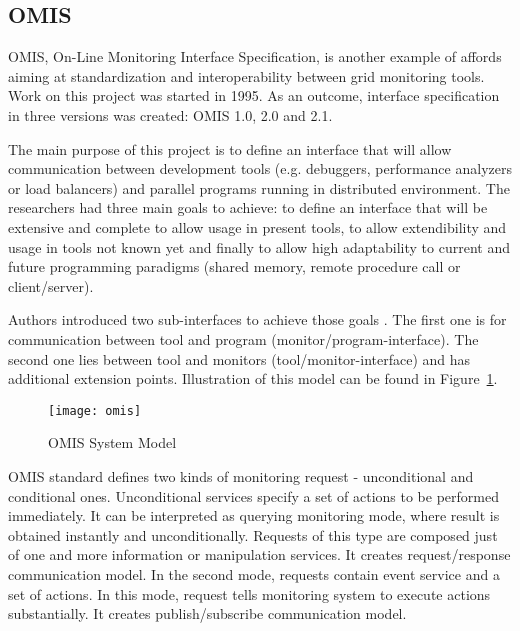 
\subsection{OMIS}

\label{ssec:omis}

OMIS, On-Line Monitoring Interface Specification, is another example of affords aiming at standardization and interoperability between grid monitoring tools. Work on this project was started in 1995. As an outcome, interface specification in three versions was created: OMIS 1.0\cite{OMIS1}, 2.0\cite{OMIS2} and 2.1.

The main purpose of this project is to define an interface that will allow communication between development tools (e.g. debuggers, performance analyzers or load balancers) and parallel programs running in distributed environment. The researchers had three main goals to achieve: to define an interface that will be extensive and complete to allow usage in present tools, to allow extendibility and usage in tools not known yet and finally to allow high adaptability to current and future programming paradigms (shared memory, remote procedure call or client/server).

Authors introduced two sub-interfaces to achieve those goals . The first one is for communication between tool and program (monitor/program-interface). The second one lies between tool and monitors (tool/monitor-interface) and has additional extension points. Illustration of this model can be found in Figure~\ref{fig:omis}.

\begin{figure}[ht]

\centering

\texttt{[image: omis]} \caption{OMIS System Model} \label{fig:omis}

\end{figure}

OMIS standard defines two kinds of monitoring request - unconditional and conditional ones. Unconditional services specify a set of actions to be performed immediately. It can be interpreted as querying monitoring mode, where result is obtained instantly and unconditionally. Requests of this type are composed just of one and more information or manipulation services. It creates request/response communication model. In the second mode, requests contain event service and a set of actions. In this mode, request tells monitoring system to execute actions substantially. It creates publish/subscribe communication model.

